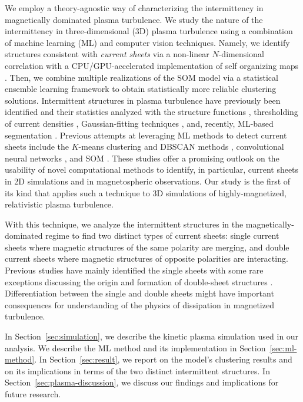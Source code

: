 We employ a theory-agnostic way of characterizing the intermittency in magnetically dominated plasma turbulence.
We study the nature of the intermittency in three-dimensional (3D) plasma turbulence using a combination of machine learning (ML) and computer vision techniques.
Namely, we identify structures consistent with \textit{current sheets} via a non-linear $N$-dimensional correlation with a CPU/GPU-accelerated implementation of self organizing maps \citep[SOM;][]{kohonen_self-organizing_1990}.
Then, we combine multiple realizations of the SOM model via a statistical ensemble learning framework to obtain statistically more reliable clustering solutions.
Intermittent structures in plasma turbulence have previously been identified and their statistics analyzed with the structure functions \citep{davis_intermittency_2024}, thresholding of current densities \citep{zhdankin_statistical_2013, kadowaki_mhd_2018}, Gaussian-fitting techniques \citep{greco_statistical_2009, chhiber_clustering_2020}, and, recently, ML-based segmentation \citep{serrano_scale_2025}.
Previous attempts at leveraging ML methods to detect current sheets include the $K$-means clustering and DBSCAN methods \citep{sisti_detecting_2021}, convolutional neural networks \citep{hu_identifying_2020}, and SOM \citep{bussov_maarja_segmentation_2021,kohne_unsupervised_2023, edmond_clustering_2024}.
These studies offer a promising outlook on the usability of novel computational methods to identify, in particular, current sheets in 2D simulations and in magnetospheric observations.
Our study is the first of its kind that applies such a technique to 3D simulations of highly-magnetized, relativistic plasma turbulence.

With this technique, we analyze the intermittent structures in the magnetically-dominated regime to find two distinct types of current sheets: single current sheets where magnetic structures of the same polarity are merging, and double current sheets where magnetic structures of opposite polarities are interacting.
Previous studies have mainly identified the single sheets \citep[e.g.,][]{zhdankin_statistical_2013,sisti_detecting_2021,davis_intermittency_2024} with some rare exceptions discussing the origin and formation of double-sheet structures \citep[e.g.,][]{howes_alfven_2013, howes_spatially_2018}.
Differentiation between the single and double sheets might have important consequences for understanding of the physics of dissipation in magnetized turbulence.

In Section~\ref{sec:simulation}, we describe the kinetic plasma simulation used in our analysis. We describe the ML method and its implementation in Section~\ref{sec:ml-method}. In Section~\ref{sec:result}, we report on the model's clustering results and on its implications in terms of the two distinct intermittent structures. In Section~\ref{sec:plasma-discussion}, we discuss our findings and implications for future research.

